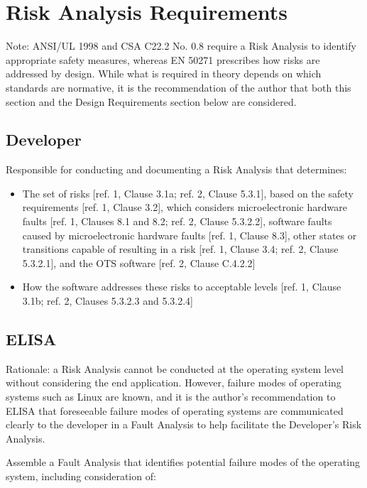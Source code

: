 \documentclass[12pt]{../Common_files/ElisaPaper}
\begin{document}
\section{Risk Analysis Requirements}
Note: ANSI/UL 1998 and CSA C22.2 No. 0.8 require a Risk Analysis to identify appropriate safety measures, whereas EN 50271 prescribes how risks are addressed by design.  While what is required in theory depends on which standards are normative, it is the recommendation of the author that both this section and the Design Requirements section below are considered.

\subsection{Developer}
Responsible for conducting and documenting a Risk Analysis that determines:

\begin{itemize}

\item The set of risks [ref. 1, Clause 3.1a; ref. 2, Clause 5.3.1], based on the safety requirements [ref. 1, Clause 3.2], which considers microelectronic hardware faults [ref. 1, Clauses 8.1 and 8.2; ref. 2, Clause 5.3.2.2], software faults caused by microelectronic hardware faults [ref. 1, Clause 8.3], other states or transitions capable of resulting in a risk [ref. 1, Clause 3.4; ref. 2, Clause 5.3.2.1], and the OTS software [ref. 2, Clause C.4.2.2]

\item How the software addresses these risks to acceptable levels [ref. 1, Clause 3.1b; ref. 2, Clauses 5.3.2.3 and 5.3.2.4]

\end{itemize}

\subsection{ELISA}
Rationale: a Risk Analysis cannot be conducted at the operating system level without considering the end application.  However, failure modes of operating systems such as Linux are known, and it is the author's recommendation to ELISA that foreseeable failure modes of operating systems are communicated clearly to the developer in a Fault Analysis to help facilitate the Developer's Risk Analysis.

Assemble a Fault Analysis that identifies potential failure modes of the operating system, including consideration of:
\end{document}
